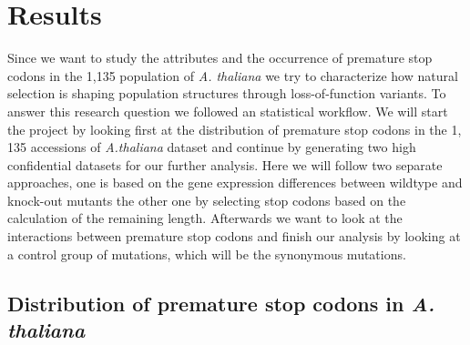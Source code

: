 \chapter{Results}
 Since we want to study the attributes and the occurrence of premature stop codons in the 1,135 population of \textit{A. thaliana} we try to characterize how natural selection is shaping population structures through loss-of-function variants. To answer this research question we followed an statistical workflow. We will start the project by looking first at the distribution of premature stop codons in the 1, 135 accessions of \textit{A.thaliana} dataset and continue by generating two high confidential datasets for our further analysis. Here we will follow two separate approaches, one is based on the gene expression differences between wildtype and knock-out mutants the other one by selecting stop codons based on the calculation of the remaining length. Afterwards we want to look at the interactions between premature stop codons and finish our analysis by looking at a control group of mutations, which will be the synonymous mutations. 
\section{Distribution of premature stop codons in \textit{A. thaliana}}

